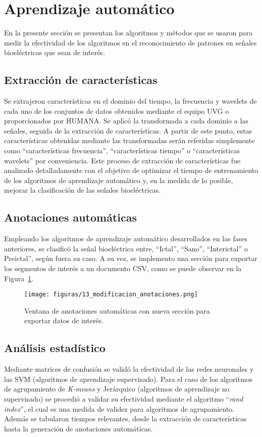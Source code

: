 \section{Aprendizaje automático}
En la presente sección se presentan los algoritmos y métodos que se usaron para medir la efectividad de los algoritmos en el reconocimiento de patrones en señales bioeléctricas que sean de interés. 

\subsection{Extracción de características}
Se extrajeron características en el dominio del tiempo, la frecuencia y \gls{wavelets} de cada uno de los conjuntos de datos obtenidos mediante el equipo UVG o proporcionados por HUMANA. Se aplicó la transformada a cada dominio a las señales, seguida de la extracción de características. A partir de este punto, estas características obtenidas mediante las transformadas serán referidas simplemente como ``características frecuencia'', ``características tiempo'' o ``características wavelets'' por conveniencia. Este proceso de extracción de características fue analizado detalladamente con el objetivo de optimizar el tiempo de entrenamiento de los algoritmos de aprendizaje automático y, en la medida de lo posible, mejorar la clasificación de las señales bioeléctricas.

\subsection{Anotaciones automáticas}
Empleando los algoritmos de aprendizaje automático desarrollados en las fases anteriores, se clasificó la señal bioeléctrica entre, ``Ictal'', ``Sano'', ``Interictal'' o Preictal'', según fuera su caso. A su vez, se implemento una sección para exportar los segmentos de interés a un documento CSV, como se puede observar en la Figura~\ref{fig:yo_anotaciones}.

\begin{figure}[H]
    \centering
    \texttt{[image: figuras/13\_modificacion\_anotaciones.png]}
    \caption{Ventana de anotaciones automáticas con nueva sección para exportar datos de interés.}
    \label{fig:yo_anotaciones}
\end{figure}

\subsection{Análisis estadístico}
Mediante matrices de confusión se validó la efectividad de las redes neuronales y las SVM (algoritmos de aprendizaje supervisado). Para el caso de los algoritmos de agrupamiento de \textit{K-means} y Jerárquico (algoritmos de aprendizaje no supervisado) se procedió a validar su efectividad mediante el algoritmo ``\textit{rand index}'', el cual es una medida de validez para algoritmos de agrupamiento. Además se tabularon tiempos relevantes, desde la extracción de características hasta la generación de anotaciones automáticas. 

